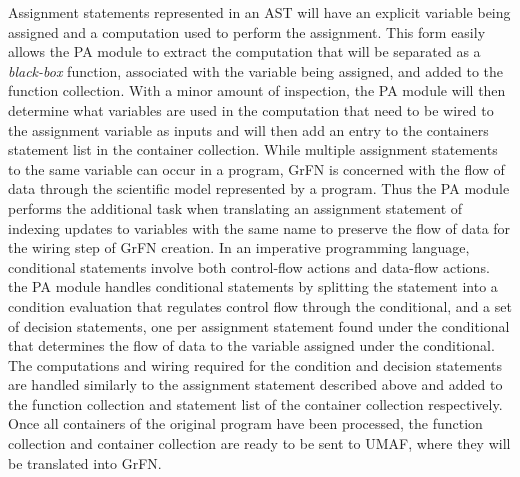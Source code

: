 Assignment statements represented in an AST will have an explicit variable being assigned and a computation used to perform the assignment.
This form easily allows the PA module to extract the computation that will be separated as a \textit{black-box} function, associated with the variable being assigned, and added to the function collection.
With a minor amount of inspection, the PA module will then determine what variables are used in the computation that need to be wired to the assignment variable as inputs and will then add an entry to the containers statement list in the container collection.
While multiple assignment statements to the same variable can occur in a program, GrFN is concerned with the flow of data through the scientific model represented by a program.
Thus the PA module performs the additional task when translating an assignment statement of indexing updates to variables with the same name to preserve the flow of data for the wiring step of GrFN creation.
In an imperative programming language, conditional statements involve both control-flow actions and data-flow actions.
the PA module handles conditional statements by splitting the statement into a condition evaluation that regulates control flow through the conditional, and a set of decision statements, one per assignment statement found under the conditional that determines the flow of data to the variable assigned under the conditional.
The computations and wiring required for the condition and decision statements are handled similarly to the assignment statement described above and added to the function collection and statement list of the container collection respectively.
Once all containers of the original program have been processed, the function collection and container collection are ready to be sent to UMAF, where they will be translated into GrFN.

